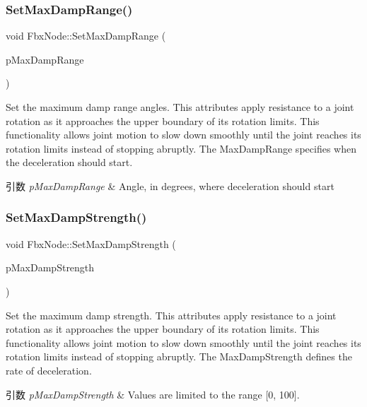 \subsubsection{\texorpdfstring{Set\+Max\+Damp\+Range()}{SetMaxDampRange()}}
{\footnotesize\ttfamily void Fbx\+Node\+::\+Set\+Max\+Damp\+Range (\begin{DoxyParamCaption}\item[{\hyperlink{class_fbx_vector4}{Fbx\+Vector4}}]{p\+Max\+Damp\+Range }\end{DoxyParamCaption})}

Set the maximum damp range angles. This attributes apply resistance to a joint rotation as it approaches the upper boundary of its rotation limits. This functionality allows joint motion to slow down smoothly until the joint reaches its rotation limits instead of stopping abruptly. The Max\+Damp\+Range specifies when the deceleration should start. 
\begin{DoxyParams}{引数}
{\em p\+Max\+Damp\+Range} & Angle, in degrees, where deceleration should start \\
\hline
\end{DoxyParams}
\mbox{\label{class_fbx_node_a54723e8134112d132a69e98fcc418e5c}} 
\subsubsection{\texorpdfstring{Set\+Max\+Damp\+Strength()}{SetMaxDampStrength()}}
{\footnotesize\ttfamily void Fbx\+Node\+::\+Set\+Max\+Damp\+Strength (\begin{DoxyParamCaption}\item[{\hyperlink{class_fbx_vector4}{Fbx\+Vector4}}]{p\+Max\+Damp\+Strength }\end{DoxyParamCaption})}

Set the maximum damp strength. This attributes apply resistance to a joint rotation as it approaches the upper boundary of its rotation limits. This functionality allows joint motion to slow down smoothly until the joint reaches its rotation limits instead of stopping abruptly. The Max\+Damp\+Strength defines the rate of deceleration. 
\begin{DoxyParams}{引数}
{\em p\+Max\+Damp\+Strength} & Values are limited to the range \mbox{[}0, 100\mbox{]}. \\
\hline
\end{DoxyParams}
\mbox{\label{class_fbx_node_a5d250af20153c92335a0d462581b07e2}} 
